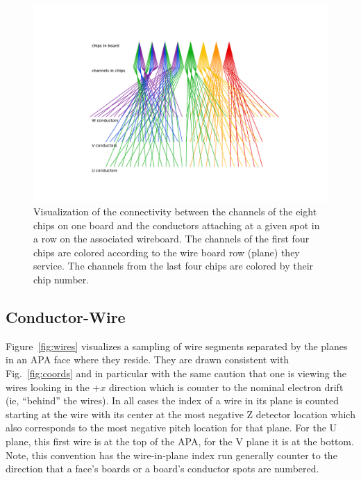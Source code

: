 \documentclass[pdftex,12pt,letter]{article}
\begin{document}
\begin{figure}[h]
  \centering
  \includegraphics[width=\textwidth]{test_plot_board_chip.pdf}
  \caption{Visualization of the connectivity between the channels of the eight chips on one board and the conductors attaching at a given spot in a row on the associated wireboard.  The channels of the first four chips are colored according to the wire board row (plane) they service.  The channels from the last four chips are colored by their chip number.}
  \label{fig:boardchip}
\end{figure}


\subsection{Conductor-Wire}

Figure~\ref{fig:wires} visualizes a sampling of wire segments separated
by the planes in an APA face where they reside.  They are drawn consistent with
Fig.~\ref{fig:coords} and in particular with the same caution that one
is viewing the wires looking in the $+x$ direction which is counter to the nominal
electron drift (ie, ``behind'' the wires).  In all cases the index of a wire in its plane is
counted starting at the wire with its center at the most negative Z detector
location which also corresponds to the most negative
pitch location for that plane.  For the U plane, this first wire is at the top of the APA, for
the V plane it is at the bottom.  Note, this convention has the
wire-in-plane index run generally counter to the direction that a face's
boards or a board's conductor spots are numbered.  
\end{document}
